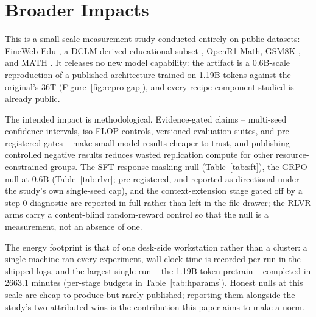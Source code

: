 \section{Broader Impacts}\label{sec:impacts}

This is a small-scale measurement study conducted entirely on public
datasets: FineWeb-Edu \citep{penedo2024fineweb}, a DCLM-derived educational
subset \citep{li2024datacomp}, OpenR1-Math, GSM8K \citep{cobbe2021training},
and MATH \citep{hendrycks2021measuring}. It releases no new model capability:
the artifact is a 0.6B-scale reproduction of a published architecture
\citep{yang2025qwen3} trained on 1.19B tokens against the original's 36T
(Figure~\ref{fig:repro-gap}), and every recipe component studied is already
public.

The intended impact is methodological. Evidence-gated claims -- multi-seed
confidence intervals, iso-FLOP controls, versioned evaluation suites, and
pre-registered gates -- make small-model results cheaper to trust, and
publishing controlled negative results reduces wasted replication compute for
other resource-constrained groups. The SFT response-masking null
(Table~\ref{tab:sft}), the GRPO null at 0.6B (Table~\ref{tab:rlvr};
pre-registered, and reported as directional under the study's own single-seed
cap), and the context-extension stage gated off by a step-0 diagnostic are
reported in full rather than left in the file drawer; the RLVR arms carry a
content-blind random-reward control \citep{shao2025spurious} so that the null
is a measurement, not an absence of one.

The energy footprint is that of one desk-side workstation rather than a
cluster: a single machine ran every experiment, wall-clock time is recorded
per run in the shipped logs, and the largest single run -- the 1.19B-token
pretrain -- completed in 2663.1 minutes (per-stage budgets in
Table~\ref{tab:hparams}). Honest nulls at this scale are cheap to produce but
rarely published; reporting them alongside the study's two attributed wins is
the contribution this paper aims to make a norm.

